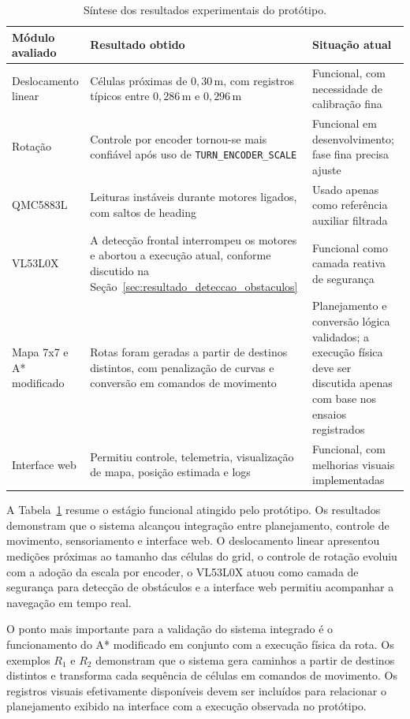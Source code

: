 \documentclass[	12pt, Times, openright, twoside, a4paper, english, brazil]{abntex2}
\begin{document}
\begin{table}[H]
	\centering
	\caption{Síntese dos resultados experimentais do protótipo.}
	\label{tab:sintese-resultados}
	\begin{tabular}{p{3.4cm} p{4.8cm} p{4.9cm}}
		\hline
		\textbf{Módulo avaliado} & \textbf{Resultado obtido} & \textbf{Situação atual} \\
		\hline
		Deslocamento linear & Células próximas de \(0{,}30\,\text{m}\), com registros típicos entre \(0{,}286\,\text{m}\) e \(0{,}296\,\text{m}\) & Funcional, com necessidade de calibração fina \\
		Rotação & Controle por encoder tornou-se mais confiável após uso de \texttt{TURN\_ENCODER\_SCALE} & Funcional em desenvolvimento; fase fina precisa ajuste \\
		QMC5883L & Leituras instáveis durante motores ligados, com saltos de heading & Usado apenas como referência auxiliar filtrada \\
		VL53L0X & A detecção frontal interrompeu os motores e abortou a execução atual, conforme discutido na Seção~\ref{sec:resultado_deteccao_obstaculos} & Funcional como camada reativa de segurança \\
		Mapa 7x7 e A* modificado & Rotas foram geradas a partir de destinos distintos, com penalização de curvas e conversão em comandos de movimento & Planejamento e conversão lógica validados; a execução física deve ser discutida apenas com base nos ensaios registrados \\
		Interface web & Permitiu controle, telemetria, visualização de mapa, posição estimada e logs & Funcional, com melhorias visuais implementadas \\
		\hline
	\end{tabular}
\end{table}

A Tabela~\ref{tab:sintese-resultados} resume o estágio funcional atingido pelo protótipo. Os resultados demonstram que o sistema alcançou integração entre planejamento, controle de movimento, sensoriamento e interface web. O deslocamento linear apresentou medições próximas ao tamanho das células do grid, o controle de rotação evoluiu com a adoção da escala por encoder, o VL53L0X atuou como camada de segurança para detecção de obstáculos e a interface web permitiu acompanhar a navegação em tempo real.

O ponto mais importante para a validação do sistema integrado é o funcionamento do A* modificado em conjunto com a execução física da rota. Os exemplos \(R_1\) e \(R_2\) demonstram que o sistema gera caminhos a partir de destinos distintos e transforma cada sequência de células em comandos de movimento. Os registros visuais efetivamente disponíveis devem ser incluídos para relacionar o planejamento exibido na interface com a execução observada no protótipo.
\end{document}
